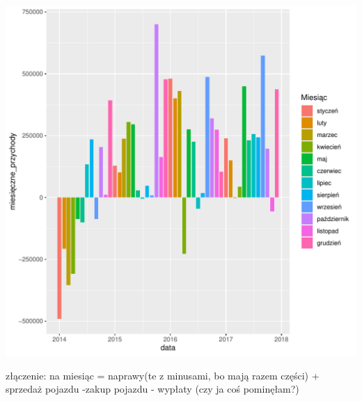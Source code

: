 \documentclass{article}\usepackage[]{graphicx}\usepackage[]{xcolor}
\makeatletter
\def\maxwidth{ %
  \ifdim\Gin@nat@width>\linewidth
    \linewidth
  \else
    \Gin@nat@width
  \fi
}
\newenvironment{knitrout}{}{} %
\makeatother
\begin{document}
\begin{knitrout}
\color{fgcolor}

{\centering \includegraphics[width=\maxwidth]{figure/unnamed-chunk-7-1} 

}


\end{knitrout}

złączenie: na miesiąc = naprawy(te z minusami, bo mają razem części) + sprzedaż pojazdu -zakup pojazdu - wypłaty (czy ja coś pominęłam?)
\end{document}
